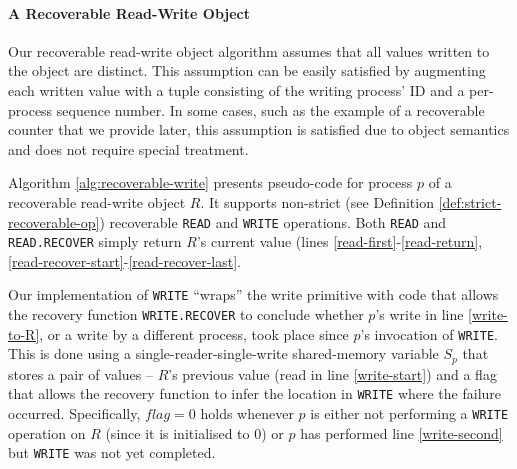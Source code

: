 \paragraph*{A Recoverable Read-Write Object}

Our recoverable read-write object algorithm assumes that all values written to the object are distinct. This assumption can be easily satisfied by augmenting each written value with a tuple consisting of the writing process' ID and a per-process sequence number. In some cases, such as the example of a recoverable counter that we provide later, this assumption is satisfied due to object semantics and does not require special treatment.

Algorithm \ref{alg:recoverable-write} presents pseudo-code for process $p$ of a recoverable read-write object $R$. It supports non-strict (see Definition \ref{def:strict-recoverable-op}) recoverable \texttt{READ} and \texttt{WRITE} operations. Both \texttt{READ} and \texttt{READ.RECOVER} simply return $R$'s current value (lines \ref{read-first}-\ref{read-return}, \ref{read-recover-start}-\ref{read-recover-last}.

Our implementation of \texttt{WRITE} ``wraps'' the write primitive with code that allows the recovery function \texttt{WRITE.RECOVER} to conclude whether $p$'s write in line \ref{write-to-R}, or a write by a different process, took place since $p$'s invocation of \texttt{WRITE}. This is done using a single-reader-single-write shared-memory variable $S_p$ that stores a pair of values -- $R$'s previous value (read in line \ref{write-start}) and a flag that allows the recovery function  to infer the location in \texttt{WRITE} where the failure occurred. Specifically, $flag=0$ holds whenever $p$ is either not performing a \texttt{WRITE} operation on $R$ (since it is initialised to $0$) or $p$ has performed line \ref{write-second} but \texttt{WRITE} was not yet completed.

